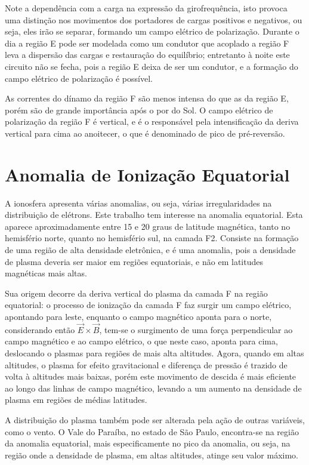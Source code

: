 Note a dependência com a carga na expressão da girofrequência, isto provoca uma distinção nos movimentos dos portadores de cargas positivos e negativos, ou seja, eles irão se separar, formando um campo elétrico de polarização. Durante o dia a região E pode ser modelada como um condutor que acoplado a região F leva a dispersão das cargas e restauração do equilíbrio; entretanto à noite este circuito não se fecha, pois a região E deixa de ser um condutor, e a formação do campo elétrico de polarização é possível.

As correntes do dínamo da região F são menos intensa do que as da região E, porém são de grande importância após o por do Sol. O campo elétrico de polarização da região F é vertical, e é o responsável pela intensificação da deriva vertical para cima ao anoitecer, o que é denominado de pico de pré-reversão.


\section{Anomalia de Ionização Equatorial}

A ionosfera apresenta várias anomalias, ou seja, várias irregularidades na distribuição de elétrons. Este trabalho tem interesse na anomalia equatorial. Esta aparece aproximadamente entre 15 e 20 graus de latitude magnética, tanto no hemisfério norte, quanto no hemisfério sul, na camada F2. Consiste na formação de uma região de alta densidade eletrônica, e é uma anomalia, pois a densidade de plasma deveria ser maior em regiões equatoriais, e não em latitudes magnéticas mais altas.

Sua origem decorre da deriva vertical do plasma da camada F na região equatorial: o processo de ionização da camada F faz surgir um campo elétrico, apontando para leste, enquanto o campo magnético aponta para o norte, considerando então $\vec{E}\times\vec{B}$, tem-se o surgimento de uma força perpendicular ao campo magnético e ao campo elétrico, o que neste caso, aponta para cima, deslocando o plasmas para regiões de mais alta altitudes. Agora, quando em altas altitudes, o plasma for efeito gravitacional e diferença de pressão é trazido de volta à altitudes mais baixas, porém este movimento de descida é mais eficiente ao longo das linhas de campo magnético, levando a um aumento na densidade de plasma em regiões de médias latitudes. 

A distribuição do plasma também pode ser alterada pela ação de outras variáveis, como o vento. O Vale do Paraíba, no estado de São Paulo, encontra-se na região da anomalia equatorial, mais especificamente no pico da anomalia, ou seja, na região onde a densidade de plasma, em altas altitudes, atinge seu valor máximo.

